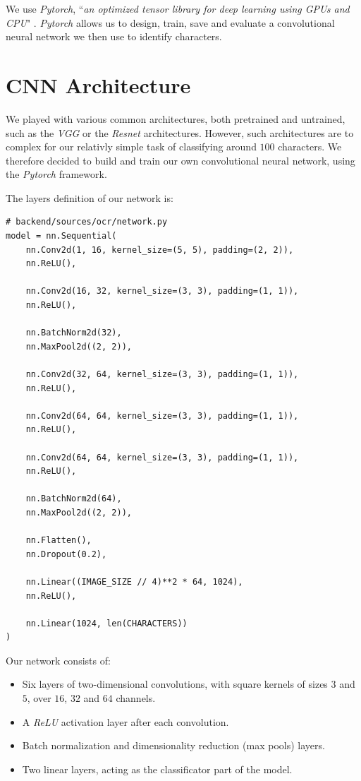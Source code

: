 \documentclass[11pt, a4paper]{report}
\begin{document}
We use \textit{Pytorch}, ``\textit{an optimized tensor library for deep learning using GPUs and CPU}" \cite{pytorch}. \textit{Pytorch} allows us to design, train, save and evaluate a convolutional neural network we then use to identify characters.

\section{CNN Architecture}

We played with various common architectures, both pretrained and untrained, such as the \textit{VGG} \cite{VGG} or the \textit{Resnet} \cite{resnet} architectures.
However, such architectures are to complex for our relativly simple task of classifying around $100$ characters. We therefore decided to build and train our own convolutional neural network, using the \textit{Pytorch} framework.

The layers definition of our network is:

\begin{verbatim}
# backend/sources/ocr/network.py
model = nn.Sequential(
    nn.Conv2d(1, 16, kernel_size=(5, 5), padding=(2, 2)),
    nn.ReLU(),
    
    nn.Conv2d(16, 32, kernel_size=(3, 3), padding=(1, 1)),
    nn.ReLU(),
    
    nn.BatchNorm2d(32),
    nn.MaxPool2d((2, 2)),
    
    nn.Conv2d(32, 64, kernel_size=(3, 3), padding=(1, 1)),
    nn.ReLU(),
    
    nn.Conv2d(64, 64, kernel_size=(3, 3), padding=(1, 1)),
    nn.ReLU(),
    
    nn.Conv2d(64, 64, kernel_size=(3, 3), padding=(1, 1)),
    nn.ReLU(),

    nn.BatchNorm2d(64),
    nn.MaxPool2d((2, 2)),

    nn.Flatten(),
    nn.Dropout(0.2),

    nn.Linear((IMAGE_SIZE // 4)**2 * 64, 1024),
    nn.ReLU(),

    nn.Linear(1024, len(CHARACTERS))
)
\end{verbatim}

Our network consists of:
\begin{itemize}
	\item Six layers of two-dimensional convolutions, with square kernels of sizes $3$ and $5$, over $16$, $32$ and $64$ channels.
	\item A \textit{ReLU} \cite{ReLU} activation layer after each convolution.
	\item Batch normalization and dimensionality reduction (max pools) layers.
	\item Two linear layers, acting as the classificator part of the model.
\end{itemize}
\end{document}

